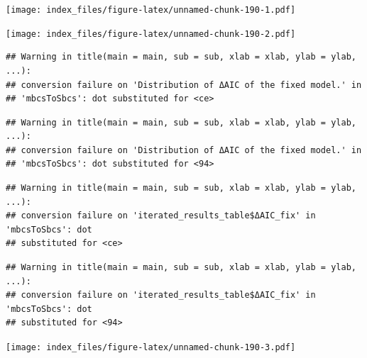 \documentclass[
]{article}
\newenvironment{Shaded}{\begin{snugshade}}{\end{snugshade}}
\newcommand{\AttributeTok}[1]{\textcolor[rgb]{0.77,0.63,0.00}{#1}}
\newcommand{\FunctionTok}[1]{\textcolor[rgb]{0.00,0.00,0.00}{#1}}
\newcommand{\NormalTok}[1]{#1}
\newcommand{\SpecialCharTok}[1]{\textcolor[rgb]{0.00,0.00,0.00}{#1}}
\newcommand{\StringTok}[1]{\textcolor[rgb]{0.31,0.60,0.02}{#1}}
\begin{document}
\texttt{[image: index\_files/figure-latex/unnamed-chunk-190-1.pdf]}

\begin{Shaded}
\end{Shaded}

\texttt{[image: index\_files/figure-latex/unnamed-chunk-190-2.pdf]}

\begin{Shaded}
\end{Shaded}

\begin{verbatim}
## Warning in title(main = main, sub = sub, xlab = xlab, ylab = ylab, ...):
## conversion failure on 'Distribution of ΔAIC of the fixed model.' in
## 'mbcsToSbcs': dot substituted for <ce>
\end{verbatim}

\begin{verbatim}
## Warning in title(main = main, sub = sub, xlab = xlab, ylab = ylab, ...):
## conversion failure on 'Distribution of ΔAIC of the fixed model.' in
## 'mbcsToSbcs': dot substituted for <94>
\end{verbatim}

\begin{verbatim}
## Warning in title(main = main, sub = sub, xlab = xlab, ylab = ylab, ...):
## conversion failure on 'iterated_results_table$ΔAIC_fix' in 'mbcsToSbcs': dot
## substituted for <ce>
\end{verbatim}

\begin{verbatim}
## Warning in title(main = main, sub = sub, xlab = xlab, ylab = ylab, ...):
## conversion failure on 'iterated_results_table$ΔAIC_fix' in 'mbcsToSbcs': dot
## substituted for <94>
\end{verbatim}

\texttt{[image: index\_files/figure-latex/unnamed-chunk-190-3.pdf]}

\begin{Shaded}
\end{Shaded}
\end{document}
